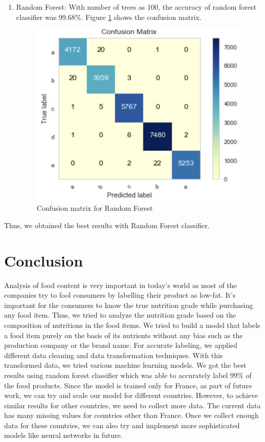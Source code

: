 \documentclass[sigconf]{acmart}
\begin{document}
\begin{enumerate}
  \item Random Forest: With number of trees as 100, the accuracy of random forest classifier was 99.68\%. Figure \ref{fig:Fig6} shows the confusion matrix. \\

\begin{figure}
\includegraphics[width=1.0\columnwidth]{images/fig6.png}
\caption{Confusion matrix for Random Forest \cite{code-base}}
\label{fig:Fig6}
\end{figure}

\end{enumerate}

Thus, we obtained the best results with Random Forest classifier.

\section{Conclusion}
Analysis of food content is very important in today's world as most of the companies try to fool consumers by labelling their product as low-fat. It's important for the consumers to know the true nutrition grade while purchasing any food item. Thus, we tried to analyze the nutrition grade based on the composition of nutritions in the food items. We tried to build a model that labels a food item purely on the basis of its nutrients without any bias such as the production company or the brand name. For accurate labeling, we applied different data cleaning and data transformation techniques. With this transformed data, we tried various machine learning models. We got the best results using random forest classifier which was able to accurately label 99\% of the food products. Since the model is trained only for France, as part of future work, we can try and scale our model for different countries. However, to achieve similar results for other countries, we need to collect more data. The current data has many missing values for countries other than France. Once we collect enough data for these countries, we can also try and implement more sophisticated models like neural networks in future.
\end{document}
